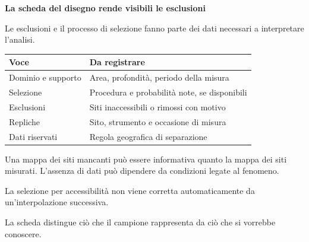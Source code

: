 \documentclass[12pt,aspectratio=1610]{beamer}
\newcommand{\PBody}[1]{\par{\fontsize{11.3}{14.8}\selectfont #1\par}}
\newcommand{\PSmall}[1]{\par{\fontsize{9.8}{13.1}\selectfont #1\par}}
\newcommand{\PInfo}[1]{%
\begin{tcolorbox}[enhanced,arc=1.6mm,boxrule=.55pt,colback=GeoTint,
 colframe=Rule!80!Classical,left=2.3mm,right=2.3mm,top=2mm,bottom=2mm,
 before skip=1mm,after skip=1mm]
\PSmall{#1}\end{tcolorbox}}
\begin{document}
\begin{frame}[plain]\hypertarget{slide90}{}
\begin{lrbox}{\TitleBox}
\begin{minipage}[t]{17.7cm}\raggedright\color{Ink}\fontsize{11.3}{14.8}\selectfont
\color{Navy}\bfseries\fontsize{20.6}{24.5}\selectfont La scheda del disegno rende visibili le esclusioni
\end{minipage}\end{lrbox}

\begin{lrbox}{\RecallBox}
\begin{minipage}[t]{14.3cm}\raggedright\color{Ink}\fontsize{11.3}{14.8}\selectfont
\fontsize{10.3}{13.8}\selectfont Le esclusioni e il processo di selezione fanno parte dei dati necessari a interpretare l’analisi.
\end{minipage}\end{lrbox}

\begin{lrbox}{\PilotLeftBox}
\begin{minipage}[t]{10.05cm}\raggedright\color{Ink}\fontsize{11.3}{14.8}\selectfont
{\fontsize{10.2}{13.1}\selectfont\renewcommand{\arraystretch}{1.45}\begin{tabular}{@{}p{3.4cm}p{5.6cm}@{}}\toprule
\textbf{Voce} & \textbf{Da registrare}\\\midrule
Dominio e supporto & Area, profondità, periodo della misura\\
Selezione & Procedura e probabilità note, se disponibili\\
Esclusioni & Siti inaccessibili o rimossi con motivo\\
Repliche & Sito, strumento e occasione di misura\\
Dati riservati & Regola geografica di separazione\\
\bottomrule\end{tabular}}

\end{minipage}\end{lrbox}

\begin{lrbox}{\PilotRightBox}
\begin{minipage}[t]{7.55cm}\raggedright\color{Ink}\fontsize{11.3}{14.8}\selectfont
\PBody{Una mappa dei siti mancanti può essere informativa quanto la mappa dei siti misurati. L’assenza di dati può dipendere da condizioni legate al fenomeno.}
\vspace{2.5mm}
\PInfo{La selezione per accessibilità non viene corretta automaticamente da un’interpolazione successiva.}
\PBody{La scheda distingue ciò che il campione rappresenta da ciò che si vorrebbe conoscere.}
\vspace{2.5mm}


\end{minipage}
\end{lrbox}
\end{frame}
\end{document}

